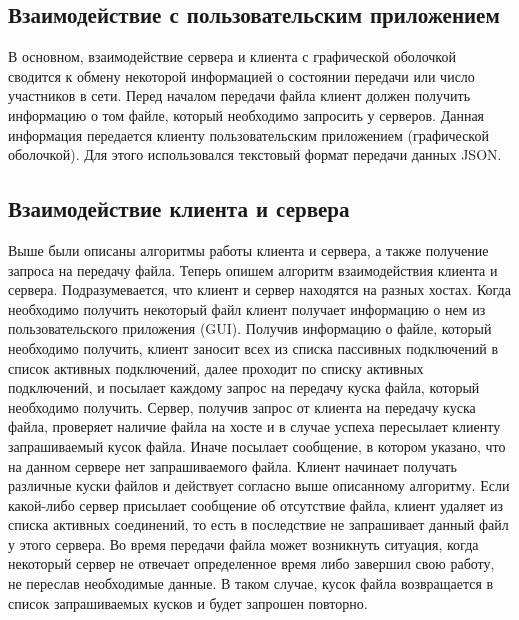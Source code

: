 \subsection{Взаимодействие с пользовательским приложением}
В основном, взаимодействие сервера и клиента с графической оболочкой
сводится к обмену некоторой информацией о состоянии передачи или число
участников в сети.
\newpar
Перед началом передачи файла клиент должен получить информацию о том
файле, который необходимо запросить у серверов. Данная информация
передается клиенту пользовательским приложением
(графической оболочкой). Для этого использовался текстовый формат передачи данных
JSON.

\subsection{Взаимодействие клиента и сервера}
Выше были описаны алгоритмы работы клиента и сервера, а также
получение запроса на передачу файла. Теперь опишем алгоритм
взаимодействия клиента и сервера. Подразумевается, что клиент и сервер
находятся на разных хостах.
\newpar
Когда необходимо получить некоторый файл клиент получает информацию о
нем из пользовательского приложения (GUI). Получив информацию о файле,
который необходимо получить, клиент заносит всех из списка пассивных
подключений в список активных подключений, далее проходит по списку
активных подключений, и посылает каждому запрос на передачу куска файла,
который необходимо получить. Сервер, получив запрос от клиента на
передачу куска файла, проверяет наличие файла на хосте и в случае успеха
пересылает клиенту запрашиваемый кусок файла. Иначе посылает
сообщение, в котором указано, что на данном сервере нет запрашиваемого
файла. Клиент начинает получать различные куски файлов и действует
согласно выше описанному алгоритму. Если какой-либо сервер присылает
сообщение об отсутствие файла, клиент удаляет из списка активных
соединений, то есть в последствие не запрашивает данный файл у этого
сервера. Во время передачи файла может возникнуть ситуация, когда
некоторый сервер не отвечает определенное время либо завершил свою
работу, не переслав необходимые данные. В таком случае, кусок файла
возвращается в список запрашиваемых кусков и будет запрошен повторно.

